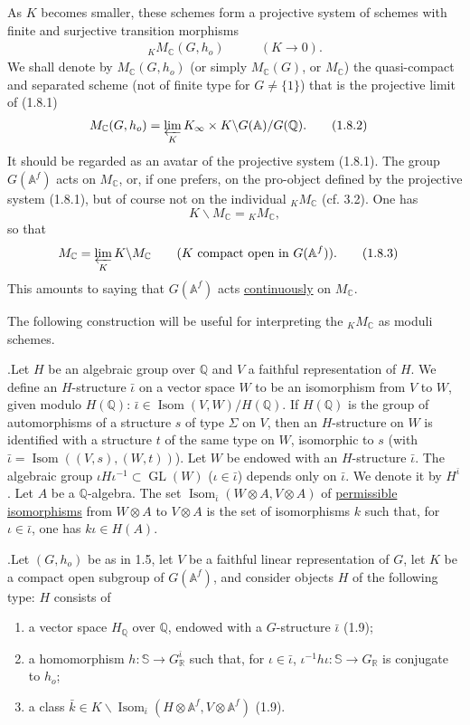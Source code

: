 \documentclass[10pt]{article}
\newcommand{\A}{\mathbb A}
\newcommand{\Af}{\mathbb A^f}
\newcommand{\C}{\mathbb C}
\newcommand{\Q}{\mathbb Q}
\newcommand{\R}{\mathbb R}
\newcommand{\bS}{\mathbb S}
\newcommand{\GL}{\operatorname{GL}}
\newcommand{\Isom}{\operatorname{Isom}}
\newcommand{\limproj}{\varprojlim}
\newcommand{\MC}{M_{\C}}
\begin{document}
As $K$ becomes smaller, these schemes form a projective system of schemes with finite and surjective transition morphisms
\begingroup
\makeatletter
\tagsleft@true
\makeatother
\begin{align}
{}_K\MC(G,h_o)&\qquad(K\to0). \tag{1.8.1}
\end{align}
\endgroup
We shall denote by $\MC(G,h_o)$ (or simply $\MC(G)$, or $\MC$) the quasi-compact and separated scheme (not of finite type for $G\ne\{1\}$) that is the projective limit of (1.8.1)
\begingroup
\makeatletter
\tagsleft@true
\makeatother
\begin{align}
\MC(G,h_o)&=\limproj_K K_\infty\times K\backslash G(\A)/G(\Q). \tag{1.8.2}
\end{align}
\endgroup
It should be regarded as an avatar of the projective system (1.8.1). The group $G(\Af)$ acts on $\MC$, or, if one prefers, on the pro-object defined by the projective system (1.8.1), but of course not on the individual ${}_K\MC$ (cf. 3.2). One has
\[
K\backslash\MC={}_K\MC,
\]
so that
\begingroup
\makeatletter
\tagsleft@true
\makeatother
\begin{align}
\MC&=\limproj_K K\backslash\MC\qquad(K\text{ compact open in }G(\Af)). \tag{1.8.3}
\end{align}
\endgroup
This amounts to saying that $G(\Af)$ acts \uline{continuously} on $\MC$.

The following construction will be useful for interpreting the ${}_K\MC$ as moduli schemes.

.\quad Let $H$ be an algebraic group over $\Q$ and $V$ a faithful representation of $H$. We define an $H$-structure $\bar\iota$ on a vector space $W$ to be an isomorphism from $V$ to $W$, given modulo $H(\Q)$: $\bar\iota\in\Isom(V,W)/H(\Q)$. If $H(\Q)$ is the group of automorphisms of a structure $s$ of type $\Sigma$ on $V$, then an $H$-structure on $W$ is identified with a structure $t$ of the same type on $W$, isomorphic to $s$ (with $\bar\iota=\Isom((V,s),(W,t))$). Let $W$ be endowed with an $H$-structure $\bar\iota$. The algebraic group $\iota H\iota^{-1}\subset\GL(W)$ ($\iota\in\bar\iota$) depends only on $\bar\iota$. We denote it by $H^{\bar\iota}$. Let $A$ be a $\Q$-algebra. The set $\Isom_{\bar\iota}(W\otimes A,V\otimes A)$ of \uline{permissible isomorphisms} from $W\otimes A$ to $V\otimes A$ is the set of isomorphisms $k$ such that, for $\iota\in\bar\iota$, one has $k\iota\in H(A)$.

.\quad Let $(G,h_o)$ be as in 1.5, let $V$ be a faithful linear representation of $G$, let $K$ be a compact open subgroup of $G(\Af)$, and consider objects $H$ of the following type: $H$ consists of
\begin{enumerate}[label=(\alph*),leftmargin=2.6em]
\item a vector space $H_\Q$ over $\Q$, endowed with a $G$-structure $\bar\iota$ (1.9);
\item a homomorphism $h:\bS\to G^{\bar\iota}_\R$ such that, for $\iota\in\bar\iota$, $\iota^{-1}h\iota:\bS\to G_\R$ is conjugate to $h_o$;
\item a class $\bar k\in K\backslash\Isom_{\bar\iota}(H\otimes\Af,V\otimes\Af)$ (1.9).
\end{enumerate}
\end{document}
